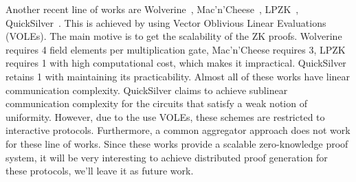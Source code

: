 Another recent line of works are Wolverine~\cite{wolverine}, Mac'n'Cheese~\cite{macncheese}, LPZK~\cite{LPZK}, QuickSilver~\cite{quicksilver}. This is achieved by using Vector Oblivious Linear Evaluations (VOLEs). The main motive is to get the scalability of the ZK proofs. Wolverine requires 4 field elements per multiplication gate, Mac'n'Cheese requires 3, LPZK requires 1 with high computational cost, which makes it impractical. QuickSilver retains 1 with maintaining its practicability. Almost all of these works have linear communication complexity. QuickSilver claims to achieve sublinear communication complexity for the circuits that satisfy a weak notion of uniformity. However, due to the use VOLEs, these schemes are restricted to interactive protocols. Furthermore, a common aggregator approach does not work for these line of works. Since these works provide a scalable zero-knowledge proof system, it will be very interesting to achieve distributed proof generation for these protocols, we'll leave it as future work.

